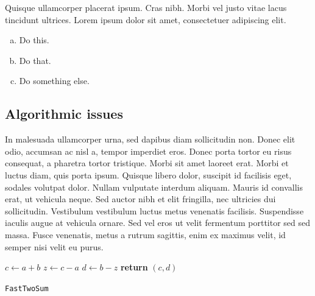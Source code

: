 \documentclass{article}
\begin{document}
\begin{question}
	Quisque ullamcorper placerat ipsum. Cras nibh. Morbi vel justo vitae lacus tincidunt ultrices. Lorem ipsum dolor sit amet, consectetuer adipiscing elit.

	\begin{enumerate}[(a)]
		\item Do this.
		\item Do that.
		\item Do something else.
	\end{enumerate}
\end{question}
	

\subsection{Algorithmic issues}

In malesuada ullamcorper urna, sed dapibus diam sollicitudin non. Donec elit odio, accumsan ac nisl a, tempor imperdiet eros. Donec porta tortor eu risus consequat, a pharetra tortor tristique. Morbi sit amet laoreet erat. Morbi et luctus diam, quis porta ipsum. Quisque libero dolor, suscipit id facilisis eget, sodales volutpat dolor. Nullam vulputate interdum aliquam. Mauris id convallis erat, ut vehicula neque. Sed auctor nibh et elit fringilla, nec ultricies dui sollicitudin. Vestibulum vestibulum luctus metus venenatis facilisis. Suspendisse iaculis augue at vehicula ornare. Sed vel eros ut velit fermentum porttitor sed sed massa. Fusce venenatis, metus a rutrum sagittis, enim ex maximus velit, id semper nisi velit eu purus.

\begin{center}
	\begin{minipage}{0.5\linewidth} %
		\begin{algorithm}[H]
			\medskip
			$c \leftarrow a + b$ \;
			$z \leftarrow c - a$ \;
			$d \leftarrow b - z$ \;
			{\bf return} $(c,d)$ \;
			\caption{\texttt{FastTwoSum}} %
			\label{alg:fastTwoSum}   %
		\end{algorithm}
	\end{minipage}
\end{center}
\end{document}
